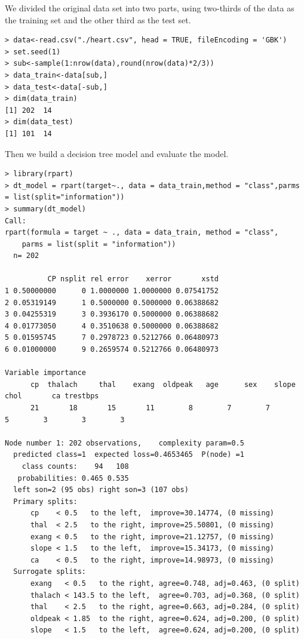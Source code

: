 \documentclass{article}
\begin{document}
We divided the original data set into two parts, using two-thirds of the data as the training set and the other third as the test set.
\begin{lstlisting}
> data<-read.csv("./heart.csv", head = TRUE, fileEncoding = 'GBK')
> set.seed(1)
> sub<-sample(1:nrow(data),round(nrow(data)*2/3))
> data_train<-data[sub,]
> data_test<-data[-sub,]
> dim(data_train)
[1] 202  14
> dim(data_test) 
[1] 101  14
\end{lstlisting}
Then we build a decision tree model and evaluate the model.
\begin{lstlisting}
> library(rpart)
> dt_model = rpart(target~., data = data_train,method = "class",parms = list(split="information"))
> summary(dt_model)
Call:
rpart(formula = target ~ ., data = data_train, method = "class", 
    parms = list(split = "information"))
  n= 202 

          CP nsplit rel error    xerror       xstd
1 0.50000000      0 1.0000000 1.0000000 0.07541752
2 0.05319149      1 0.5000000 0.5000000 0.06388682
3 0.04255319      3 0.3936170 0.5000000 0.06388682
4 0.01773050      4 0.3510638 0.5000000 0.06388682
5 0.01595745      7 0.2978723 0.5212766 0.06480973
6 0.01000000      9 0.2659574 0.5212766 0.06480973

Variable importance
      cp  thalach     thal    exang  oldpeak   age      sex    slope     chol       ca trestbps 
      21       18       15       11        8        7        7        5        3        3        3 

Node number 1: 202 observations,    complexity param=0.5
  predicted class=1  expected loss=0.4653465  P(node) =1
    class counts:    94   108
   probabilities: 0.465 0.535 
  left son=2 (95 obs) right son=3 (107 obs)
  Primary splits:
      cp    < 0.5   to the left,  improve=30.14774, (0 missing)
      thal  < 2.5   to the right, improve=25.50801, (0 missing)
      exang < 0.5   to the right, improve=21.12757, (0 missing)
      slope < 1.5   to the left,  improve=15.34173, (0 missing)
      ca    < 0.5   to the right, improve=14.98973, (0 missing)
  Surrogate splits:
      exang   < 0.5   to the right, agree=0.748, adj=0.463, (0 split)
      thalach < 143.5 to the left,  agree=0.703, adj=0.368, (0 split)
      thal    < 2.5   to the right, agree=0.663, adj=0.284, (0 split)
      oldpeak < 1.85  to the right, agree=0.624, adj=0.200, (0 split)
      slope   < 1.5   to the left,  agree=0.624, adj=0.200, (0 split)


\end{lstlisting}
\end{document}
